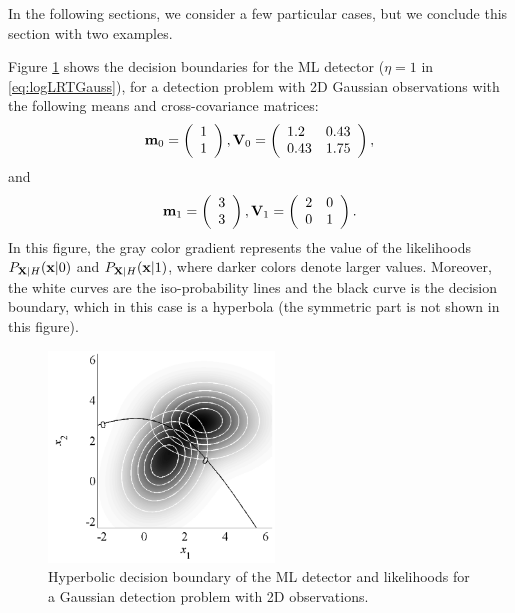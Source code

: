 In the following sections, we consider a few particular cases, but we conclude this section with two examples.

\begin{example}
	Figure \ref{fig:DecGauss2Dhip} shows the decision boundaries for the ML detector ($\eta = 1$ in \eqref{eq:logLRTGauss}), for a detection problem with 2D Gaussian observations with the following means and cross-covariance matrices:
	\begin{equation*}
	{\bf m}_0 =  \left(\begin{array}{l}  1 \\ 1 \end{array}\right), {\bf V}_0 = 
	\left(\begin{array}{ll} 1.2 & 0.43 \\ 0.43 & 1.75 \end{array} \right),
	\end{equation*}
	and
	\begin{equation*}
	{\bf m}_1 = \left(\begin{array}{l}  3 \\ 3 \end{array}\right), {\bf V}_1 = 
	\left(\begin{array}{ll} 2 & 0 \\ 0 & 1 \end{array} \right).
	\end{equation*}
	In this figure, the gray color gradient  represents the value of the likelihoods $P_{{\bf X}|H}({\bf x}|0)$ and $P_{{\bf X}|H}({\bf x}|1)$, where darker colors denote larger values. Moreover, the white curves are the iso-probability lines and the black curve is the decision boundary, which in this case is a hyperbola (the symmetric part is not shown in this figure).
	
	\begin{figure}[htb]
		\begin{center}
			\includegraphics[width=6cm]{Figures/DecGauss2Dhip}
			\caption{Hyperbolic decision boundary of the ML detector and likelihoods for a Gaussian detection problem with 2D observations.}
			\label{fig:DecGauss2Dhip}
		\end{center}
	\end{figure}
\end{example}

